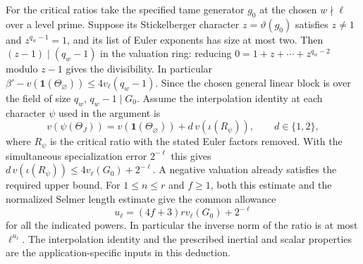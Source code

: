 For the critical ratios take the specified tame generator $g_0$ at the
chosen $w\nmid\ell$ over a level prime. Suppose its Stickelberger
character $z=\vartheta(g_0)$ satisfies $z\ne1$ and $z^{q_w-1}=1$,
and its list of Euler exponents has size at most two. Then
$(z-1)\mid(q_w-1)$ in the valuation ring: reducing
$0=1+z+\cdots+z^{q_w-2}$ modulo $z-1$ gives the divisibility.
In particular $\beta'-v(\boldsymbol{1}(\Theta_\varnothing))
\le4v_\ell(q_w-1)$. Since the chosen general linear block is over
the field of size $q_w$, $q_w-1\mid G_0$. Assume the interpolation
identity at each character $\psi$ used in the argument is
\[
 v(\psi(\Theta_J))=v(\boldsymbol{1}(\Theta_\varnothing))
                        +d\,v(\iota(R_\psi)),\qquad d\in\{1,2\},
\]
where $R_\psi$ is the critical ratio with the stated Euler factors removed.
With the simultaneous specialization error $2^{-\ell}$ this gives
$d\,v(\iota(R_\psi))\le4v_\ell(G_0)+2^{-\ell}$. A negative valuation
already satisfies the required upper bound. For $1\le n\le r$ and $f\ge1$,
both this estimate and the normalized Selmer length estimate give the common
allowance
\[
                     u_\ell=(4f+3)r v_\ell(G_0)+2^{-\ell}
\]
for all the indicated powers. In particular the inverse norm of the ratio is
at most $\ell^{u_\ell}$. The interpolation identity and the prescribed
inertial and scalar properties are the application-specific inputs in
this deduction.
